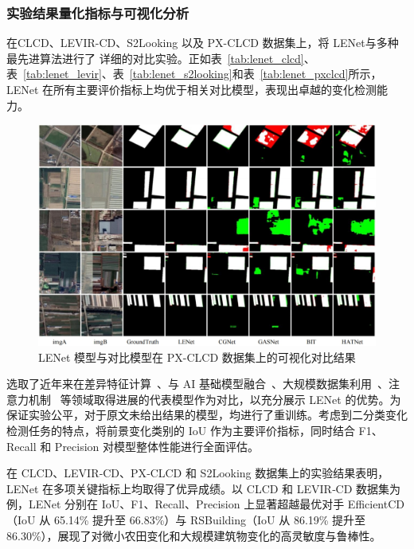 \subsubsection{实验结果量化指标与可视化分析}
在CLCD、LEVIR-CD、S2Looking 以及 PX-CLCD 数据集上，将 LENet与多种最先进算法进行了 详细的对比实验。正如表~\ref{tab:lenet_clcd}、表~\ref{tab:lenet_levir}、表~\ref{tab:lenet_s2looking}和表~\ref{tab:lenet_pxclcd}所示，LENet 在所有主要评价指标上均优于相关对比模型，表现出卓越的变化检测能力。

\begin{figure}[!htb]
  \centering
  \includegraphics[width=\textwidth]{paper_figures/基于双时相遥感影像特征交互的变化检测算法研究/LENet/lenet_pxclcd.png}
  \caption{LENet 模型与对比模型在 PX-CLCD 数据集上的可视化对比结果}
  \label{fig:lenet_pxclcd}
\end{figure}

选取了近年来在差异特征计算~\cite{feng_change_2023}、与 AI 基础模型融合~\cite{Sun2024SegmentAM, Qiu2025DEDSAMAdaptingSA}、大规模数据集利用~\cite{wang_rsbuilding_2024}、注意力机制~\cite{Song2023AxialCA, chen_remote_2022} 等领域取得进展的代表模型作为对比，以充分展示 LENet 的优势。为保证实验公平，对于原文未给出结果的模型，均进行了重训练。考虑到二分类变化检测任务的特点，将前景变化类别的 IoU 作为主要评价指标，同时结合 F1、Recall 和 Precision 对模型整体性能进行全面评估。

在 CLCD、LEVIR‐CD、PX‐CLCD 和 S2Looking 数据集上的实验结果表明，LENet 在多项关键指标上均取得了优异成绩。以 CLCD 和 LEVIR‐CD 数据集为例，LENet 分别在 IoU、F1、Recall、Precision 上显著超越最优对手 EfficientCD（IoU 从 65.14\% 提升至 66.83\%）与 RSBuilding（IoU 从 86.19\% 提升至 86.30\%），展现了对微小农田变化和大规模建筑物变化的高灵敏度与鲁棒性。

